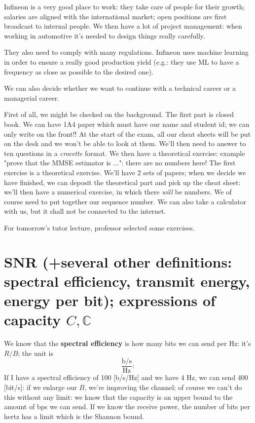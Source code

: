\documentclass[a4paper, 12pt]{book}
\begin{document}
Infineon is a very good place to work: they take care of people for their growth; salaries are aligned with the international market; open positions are first broadcast to internal people. We then have a lot of project management: when working in automotive it's needed to design things really carefully.


They also need to comply with many regulations.
Infineon uses machine learning in order to ensure a really good production yield (e.g.: they use ML to have a frequency as close as possible to the desired one).

\begin{greenbar}
We can also decide whether we want to continue with a technical career or a managerial career.
\end{greenbar}

\begin{tcolorbox}[colframe=red, colback=white, title=\faBolt\ What is the structure of the exam?, fonttitle=\bfseries]
First of all, we might be checked on the background.
The first part is closed book. We can have 1A4 paper which must have our name and student id; we can only write on the front!!
At the start of the exam, all our cheat sheets will be put on the desk and we won't be able to look at them. We'll then need to answer to ten questions in a \textit{crocette} format. We then have a theoretical exercise: example "prove that the MMSE estimator is ...": there are no numbers here! The first exercise is a theoretical exercise. We'll have 2 sets of papers; when we decide we have finished, we can deposit the theoretical part and pick up the cheat sheet: we'll then have a numerical exercise, in which there \textit{will} be numbers.
We of course need to put together our sequence number.
We can also take a calculator with us, but it shall not be connected to the internet.
\end{tcolorbox}

\begin{greenbar}
For tomorrow's tutor lecture, professor selected some exercises.
\end{greenbar}

\section[SNR and several other definitions]{SNR (+several other definitions: spectral efficiency, transmit energy, energy per bit); expressions of capacity $C, \mathbb{C}$}

We know that the \textbf{spectral efficiency} is how many bits we can send per Hz: it's $R/B$; the unit is
\[
\frac{\text{b/s}}{\text{Hz}} :
\]
If I have a spectral efficiency of 100 [b/s/Hz] and we have 4 Hz, we can send 400 [bit/s]: if we enlarge our $B$, we're improving the channel; of course we can't do this without any limit: we know that the capacity is an upper bound to the amount of bps we can send. If we know the receive power, the number of bits per hertz has a limit which is the Shannon bound.
\end{document}
